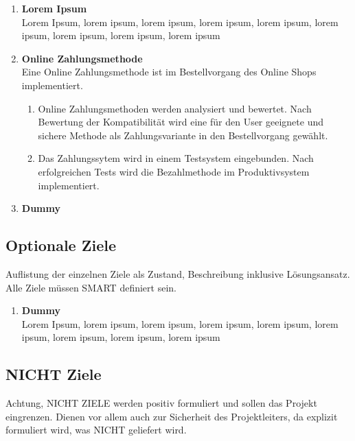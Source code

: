 \documentclass[
	headings=optiontotocandhead,%
	oneside,
	numbers=noenddot,%
	toc=flat, %
	10pt, %
	parskip=full, %
	listof=totoc, %
	listof=flat, %
	numbers=noenddot, %
	bibliography=totoc, %
	a4paper,DIV=14,
]{scrartcl}
\begin{document}
\begin{enumerate}[start=1,label={\bfseries Ziel-H \arabic*},leftmargin=*,wide]
\item{\bfseries{Lorem Ipsum}}\\
Lorem Ipsum, lorem ipsum, lorem ipsum, lorem ipsum, lorem ipsum, lorem ipsum, lorem ipsum, lorem ipsum, lorem ipsum

\item{\bfseries{Online Zahlungsmethode}}\\
Eine Online Zahlungsmethode ist im Bestellvorgang des Online Shops implementiert.

\begin{enumerate}[label=\alph*.]
\item{Online Zahlungsmethoden werden analysiert und bewertet. Nach Bewertung der Kompatibilität wird eine für den User geeignete und sichere Methode als Zahlungsvariante in den Bestellvorgang gewählt.}\\

\item{Das Zahlungssytem wird in einem Testsystem eingebunden. Nach erfolgreichen Tests wird die Bezahlmethode im Produktivsystem implementiert.}\\
\end{enumerate}

\item{\bfseries{Dummy}}\\
\end{enumerate}

\subsection{Optionale Ziele}
Auflistung der einzelnen Ziele als Zustand, Beschreibung inklusive Lösungsansatz. Alle Ziele müssen SMART definiert sein.

\begin{enumerate}[start=1,label={\bfseries Ziel-O \arabic*},leftmargin=*,wide]
\item{\bfseries{Dummy}}\\
Lorem Ipsum, lorem ipsum, lorem ipsum, lorem ipsum, lorem ipsum, lorem ipsum, lorem ipsum, lorem ipsum, lorem ipsum
\end{enumerate}

\subsection{NICHT Ziele}
Achtung, NICHT ZIELE werden positiv formuliert und sollen das Projekt eingrenzen. Dienen vor allem auch zur Sicherheit des Projektleiters, da explizit formuliert wird, was NICHT geliefert wird.
\end{document}
